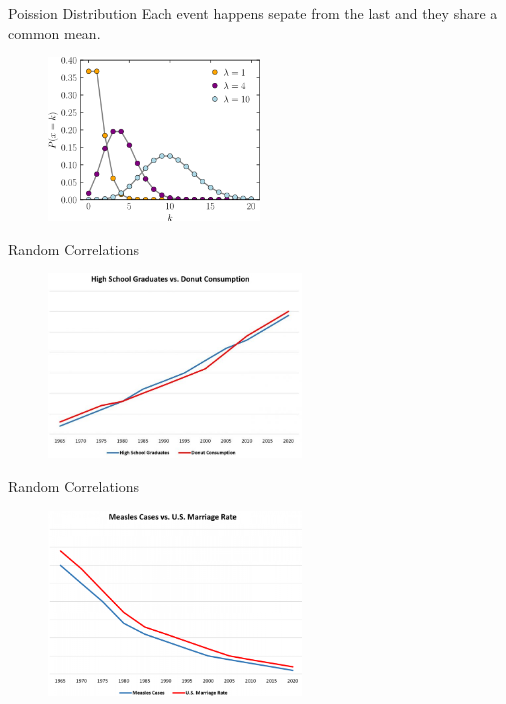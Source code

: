 \documentclass[12pt, aspectratio=169]{beamer}
\begin{document}
\begin{frame}{Poission Distribution}
Each event happens sepate from the last and they share a common mean. 
             \centering
               \begin{figure}
                 \includegraphics[width=0.5\textwidth]{Poisson_pmf.svg.png}
               \end{figure}


\end{frame}


\begin{frame}{Random Correlations}
  \centering
  \begin{figure}
    \includegraphics[width=0.6\textwidth]{correlation3.jpg}
  \end{figure}

            
\end{frame}

\begin{frame}{Random Correlations}
  \centering
  \begin{figure}
    \includegraphics[width=0.6\textwidth]{correlations2.png}
  \end{figure}

            
\end{frame}
\end{document}
